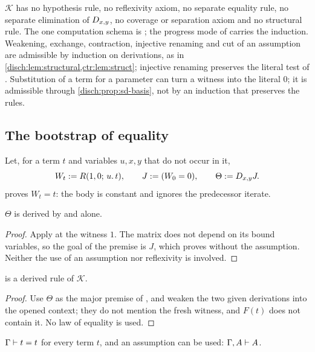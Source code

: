 $\mathcal K$ has no hypothesis rule, no reflexivity axiom, no separate
equality rule, no separate elimination of $D_{x,y}$, no coverage or
separation axiom and no structural rule. The one computation schema is
; the progress mode of  carries the
induction. Weakening, exchange, contraction, injective renaming and cut of
an assumption are admissible by induction on derivations, as in
\cref{disch:lem:structural,ctr:lem:struct}; injective renaming preserves the literal test
of . Substitution of a term for a parameter can turn a
witness into the literal $0$; it is admissible through
\cref{disch:prop:sd-basis}, not by an induction that preserves the rules.

\subsection{The bootstrap of equality}

Let, for a term $t$ and variables $u,x,y$ that do not occur in it,
\[
 W_t\mathrel{:=} R(1,0;\,u.\,t),\qquad J\mathrel{:=}(W_0=0),\qquad
 \Theta\mathrel{:=}D_{x,y}J .
\]
 proves $W_t=t$: the body is constant and ignores the
predecessor iterate.

\begin{lemma}
\label{disch:lem:theta}
$\Theta$ is derived by  and  alone.
\end{lemma}

\begin{proof}
Apply  at the witness $1$. The matrix does not depend on
its bound variables, so the goal of the premise is $J$, which
 proves without the assumption. Neither the use of an
assumption nor reflexivity is involved.
\end{proof}

\begin{lemma}
\label{disch:lem:sd-transport}
 is a derived rule of $\mathcal K$.
\end{lemma}

\begin{proof}
Use $\Theta$ as the major premise of , and weaken the two
given derivations into the opened context; they do not mention the fresh
witness, and $F(t)$ does not contain it. No law of equality is used.
\end{proof}

\begin{lemma}
\label{disch:lem:sd-refl}
$\Gamma\vdash t=t$ for every term $t$, and an assumption can be used:
$\Gamma,A\vdash A$.
\end{lemma}

